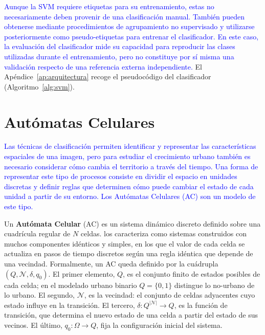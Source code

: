 \textcolor{blue}{Aunque la SVM requiere etiquetas para su entrenamiento, estas no necesariamente deben provenir de una clasificación manual. También pueden obtenerse mediante procedimientos de agrupamiento no supervisado y utilizarse posteriormente como pseudo-etiquetas para entrenar el clasificador. En este caso, la evaluación del clasificador mide su capacidad para reproducir las clases utilizadas durante el entrenamiento, pero no constituye por sí misma una validación respecto de una referencia externa independiente.} El Apéndice~\ref{ap:arquitectura} recoge el pseudocódigo del clasificador (Algoritmo~\ref{alg:svm}).



\section{Autómatas Celulares}
\label{sec:automatas-celulares}

\textcolor{blue}{Las técnicas de clasificación permiten identificar y representar las características espaciales de una imagen, pero para estudiar el crecimiento urbano también es necesario considerar cómo cambia el territorio a través del tiempo. Una forma de representar este tipo de procesos consiste en dividir el espacio en unidades discretas y definir reglas que determinen cómo puede cambiar el estado de cada unidad a partir de su entorno. Los Autómatas Celulares (AC) son un modelo de este tipo.}

Un \textbf{Autómata Celular} (AC) es un sistema dinámico discreto definido sobre una cuadrícula regular de $N$ celdas. \textcite{Wolfram1984} los caracteriza como sistemas construidos con muchos componentes idénticos y simples, en los que el valor de cada celda se actualiza en pasos de tiempo discretos según una regla idéntica que depende de una vecindad. Formalmente, un AC queda definido por la cuádrupla $(Q, \mathcal{N}, \delta, q_0)$. El primer elemento, $Q$, es el conjunto finito de estados posibles de cada celda; en el modelado urbano binario $Q = \{0, 1\}$ distingue lo no-urbano de lo urbano. El segundo, $\mathcal{N}$, es la vecindad: el conjunto de celdas adyacentes cuyo estado influye en la transición. El tercero, $\delta: Q^{|\mathcal{N}|} \to Q$, es la función de transición, que determina el nuevo estado de una celda a partir del estado de sus vecinos. El último, $q_0: \Omega \to Q$, fija la configuración inicial del sistema.

